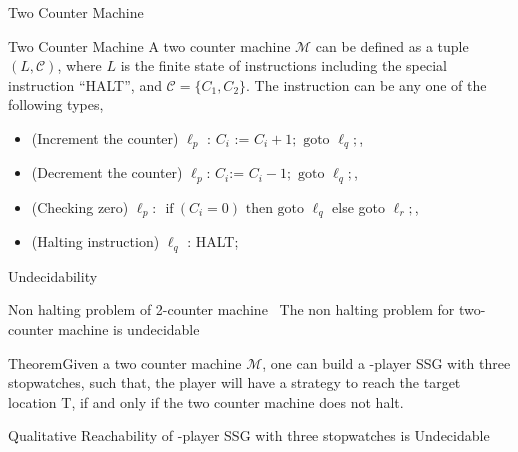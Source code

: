 \documentclass{beamer}
\begin{document}
             \begin{frame}{Two Counter Machine}
               \begin{block}{Two Counter Machine} \scriptsize
                 A two counter machine $\mathcal{M}$ can be defined as a tuple $(L,\mathcal{C})$, where $L$ is the
 finite state of instructions including the special instruction
 ``HALT'', and $\mathcal{C}=\{C_{1},C_{2}\}$. The instruction can be any one of the
 following types,
  \end{block}
 \begin{itemize}\scriptsize
 \item  (Increment the counter) $\ell_{p}$ : $C_{i}$ := $C_{i}+1; \textrm{ goto } \ell_{q};$,
 \item  (Decrement the counter)
   $\ell_{p}$: $C_{i}$:= $C_{i}-1; \textrm{ goto } \ell_{q};$,
   \item (Checking zero)
   $\ell_{p}$: $\textrm{ if}~(C_{i} = 0) \textrm{ then goto } \ell_{q}$
   else goto $\ell_{r};$,
   \item (Halting instruction) $\ell_{q}$ : HALT;
   \end{itemize}
 \end{frame}
   \begin{frame}{Undecidability}
   \begin{block}{Non halting problem of 2-counter machine~}\scriptsize
    The non halting problem for
 two-counter machine is undecidable
     \end{block}
               \begin{alertblock}{Theorem}\scriptsize Given a two counter machine $\mathcal{M}$, one can build
               a \onehalf-player SSG with three stopwatches, such that,
               the player will have a strategy to reach the target
               location T, if and only if the two counter machine does
               not halt.
             \end{alertblock}
             \pause
              \begin{exampleblock}{\scriptsize Qualitative Reachability of
                 \onehalf-player SSG with three stopwatches is Undecidable}
               \end{exampleblock}
             \end{frame}
\end{document}
